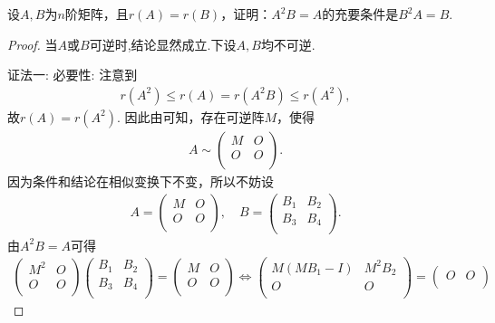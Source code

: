 \documentclass[../../main.tex]{subfiles}%
\begin{document}
\begin{example}
设$A,B$为$n$阶矩阵，且$r(A)=r(B)$，证明：$A^2B = A$的充要条件是$B^2A = B$.
\end{example}
\begin{proof}
当$A$或$B$可逆时,结论显然成立.下设$A,B$均不可逆.

{\color{blue}证法一:}
{\heiti 必要性:} 注意到
\begin{align*}
r(A^2) \leqslant r(A) = r(A^2B) \leqslant r(A^2),
\end{align*}
故\(r(A) = r(A^2)\). 因此由可知，存在可逆阵\(M\)，使得
\begin{align*}
A \sim \begin{pmatrix}
M&		O\\
O&		O\\
\end{pmatrix}.
\end{align*}
因为条件和结论在相似变换下不变，所以不妨设
\begin{align*}
A = \begin{pmatrix}
M&		O\\
O&		O\\
\end{pmatrix},\quad B = \begin{pmatrix}
B_1&		B_2\\
B_3&		B_4\\
\end{pmatrix}.
\end{align*}
由\(A^2B = A\)可得
\begin{align*}
\begin{pmatrix}
M^2&		O\\
O&		O\\
\end{pmatrix} \begin{pmatrix}
B_1&		B_2\\
B_3&		B_4\\
\end{pmatrix} = \begin{pmatrix}
M&		O\\
O&		O\\
\end{pmatrix} \Longleftrightarrow \begin{pmatrix}
M(MB_1 - I)&		M^2B_2\\
O&		O\\
\end{pmatrix} = \begin{pmatrix}
O&		O\\

\end{pmatrix}
\end{align*}
\end{proof}
\end{document}

